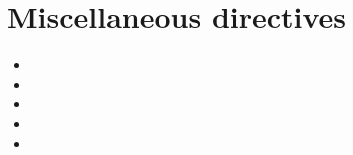 \section{Miscellaneous directives}

\begin{itemize}
\item {}
\item {}
\item {}
\item {}
\item {}
\end{itemize}

